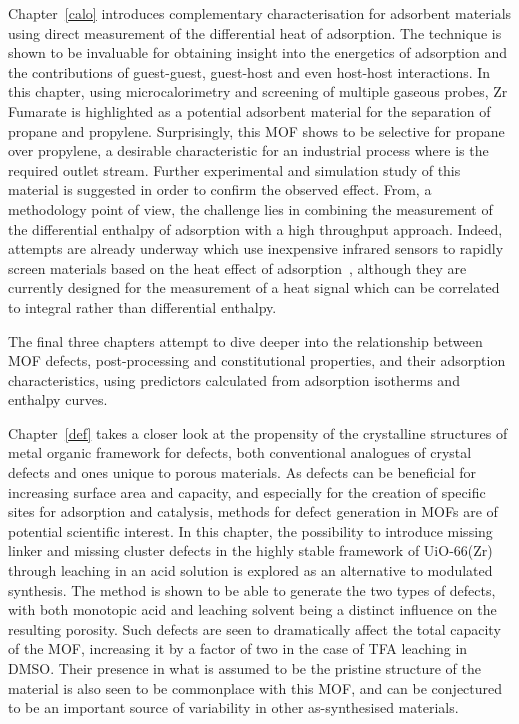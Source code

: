 Chapter~\ref{calo} introduces complementary characterisation 
for adsorbent materials using direct measurement of the
differential heat of adsorption. The technique is shown to be 
invaluable for obtaining insight into the energetics of 
adsorption and the contributions of guest-guest, guest-host 
and even host-host interactions. In this chapter,
using microcalorimetry and screening of multiple gaseous probes,
Zr Fumarate is highlighted as a potential adsorbent material for the 
separation of propane and propylene. Surprisingly, this \gls{MOF} shows
to be selective for propane over propylene, a desirable characteristic
for an industrial process where  is the required
outlet stream. Further experimental and simulation study of this
material is suggested in order to confirm the observed effect.
From, a methodology point of view, the challenge lies in combining
the measurement of the differential enthalpy of adsorption with a 
high throughput approach. 
Indeed, attempts are already underway which use inexpensive infrared 
sensors to rapidly screen materials based on the heat effect of 
adsorption~\cite{wollmannInfrasorbOpticalDetection2012}, although
they are currently designed for the measurement of a heat signal 
which can be correlated to  integral rather than differential enthalpy.

The final three chapters attempt to dive deeper into the relationship
between \gls{MOF} defects, post-processing and constitutional properties,
and their adsorption characteristics, using predictors calculated from
adsorption isotherms and enthalpy curves.

Chapter~\ref{def} takes a closer look at the propensity of the 
crystalline structures of metal organic framework for defects,
both conventional analogues of crystal defects and ones unique
to porous materials. As defects can be beneficial for increasing 
surface area and capacity, and especially for the creation
of specific sites for adsorption and catalysis, methods for 
defect generation in \glspl{MOF} are of potential scientific interest.
In this chapter, the possibility to introduce missing linker and 
missing cluster defects in the highly stable framework of UiO-66(Zr)
through leaching in an acid solution is explored as an alternative 
to modulated synthesis. The method is shown to be able to generate
the two types of defects, with both monotopic acid and leaching 
solvent being a distinct influence on the resulting porosity.
Such defects are seen to dramatically affect the total capacity 
of the \gls{MOF}, increasing it by a factor of two in the case of \gls{TFA}
leaching in \gls{DMSO}. Their presence in what is assumed
to be the pristine structure of the material is also seen 
to be commonplace with this \gls{MOF}, and can be conjectured to be an
important source of variability in other as-synthesised materials.

